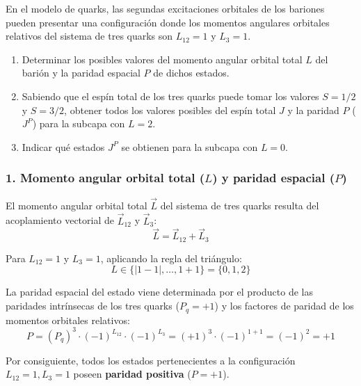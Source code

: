 \begin{problema}
En el modelo de quarks, las segundas excitaciones orbitales de los bariones pueden presentar una configuración donde los momentos angulares orbitales relativos del sistema de tres quarks son $L_{12} = 1$ y $L_3 = 1$.

\begin{enumerate}[label=\alph*)]
    \item Determinar los posibles valores del momento angular orbital total $L$ del barión y la paridad espacial $P$ de dichos estados.
    \item Sabiendo que el espín total de los tres quarks puede tomar los valores $S = 1/2$ y $S = 3/2$, obtener todos los valores posibles del espín total $J$ y la paridad $P$ ($J^P$) para la subcapa con $L = 2$.
    \item Indicar qué estados $J^P$ se obtienen para la subcapa con $L = 0$.
\end{enumerate}

\tcblower

\subsubsection*{1. Momento angular orbital total ($L$) y paridad espacial ($P$)}

El momento angular orbital total $\vec{L}$ del sistema de tres quarks resulta del acoplamiento vectorial de $\vec{L}_{12}$ y $\vec{L}_3$:
\begin{equation*}
\vec{L} = \vec{L}_{12} + \vec{L}_3
\end{equation*}

Para $L_{12} = 1$ y $L_3 = 1$, aplicando la regla del triángulo:
\begin{equation*}
L \in \{|1 - 1|, \dots, 1 + 1\} = \{0, 1, 2\}
\end{equation*}

La paridad espacial del estado viene determinada por el producto de las paridades intrínsecas de los tres quarks ($P_q = +1$) y los factores de paridad de los momentos orbitales relativos:
\begin{equation*}
P = (P_q)^3 \cdot (-1)^{L_{12}} \cdot (-1)^{L_3} = (+1)^3 \cdot (-1)^{1+1} = (-1)^2 = +1
\end{equation*}

Por consiguiente, todos los estados pertenecientes a la configuración $L_{12} = 1, L_3 = 1$ poseen \textbf{paridad positiva} ($P = +1$).


\end{problema}
